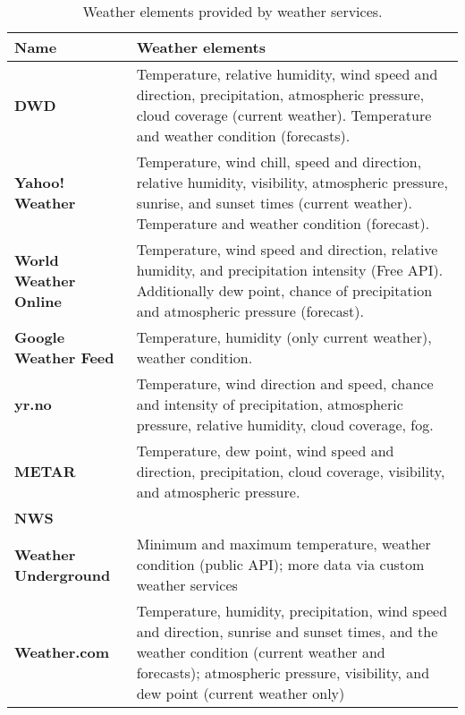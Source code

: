 \begin{table}
\centering
\begin{tabular}{|p{}|p{}|}
  \hline
  \textbf{Name} & \textbf{Weather elements} \\
  \hline\hline
  \textbf{DWD} & Temperature, relative humidity, wind speed and direction, precipitation, atmospheric pressure, cloud coverage (current weather). Temperature and weather condition (forecasts).\\
  \hline
  \textbf{Yahoo! Weather} & Temperature, wind chill, speed and direction, relative humidity, visibility, atmospheric pressure, sunrise, and sunset times (current weather). Temperature and weather condition (forecast).\\
  \hline
  \textbf{World Weather Online} & Temperature, wind speed and direction, relative humidity, and precipitation intensity (Free API). Additionally dew point, chance of precipitation and atmospheric pressure (forecast).\\
  \hline
  \textbf{Google Weather Feed} & Temperature, humidity (only current weather), weather condition.\\
  \hline
  \textbf{yr.no} & Temperature, wind direction and speed, chance and intensity of precipitation, atmospheric pressure, relative humidity, cloud coverage, fog.\\
  \hline
  \textbf{\acs{METAR}} & Temperature, dew point, wind speed and direction, precipitation, cloud coverage, visibility, and atmospheric pressure. \\
  \hline
  \textbf{\acs{NWS}} & \\ %
  \hline
  \textbf{Weather Underground} & Minimum and maximum temperature, weather condition (public API); more data via custom weather services \\
  \hline
  \textbf{Weather.com} & Temperature, humidity, precipitation, wind speed and direction, sunrise and sunset times, and the weather condition (current weather and forecasts); atmospheric pressure, visibility, and dew point (current weather only) \\
  \hline
\end{tabular}
\vspace{.5em}
\caption{Weather elements provided by weather services.}
\label{table:weather_data6}
\end{table}

